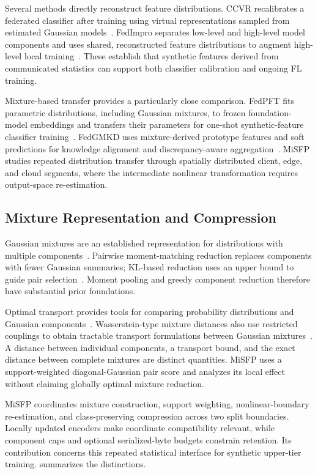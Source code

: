 Several methods directly reconstruct feature distributions. CCVR recalibrates a federated classifier after training using virtual representations sampled from estimated Gaussian models~\cite{luo2021ccvr}. FedImpro separates low-level and high-level model components and uses shared, reconstructed feature distributions to augment high-level local training~\cite{tang2024fedimpro}. These establish that synthetic features derived from communicated statistics can support both classifier calibration and ongoing FL training.

Mixture-based transfer provides a particularly close comparison. FedPFT fits parametric distributions, including Gaussian mixtures, to frozen foundation-model embeddings and transfers their parameters for one-shot synthetic-feature classifier training~\cite{beitollahi2025fedpft}. FedGMKD uses mixture-derived prototype features and soft predictions for knowledge alignment and discrepancy-aware aggregation~\cite{zhang2024fedgmkd}. MiSFP studies repeated distribution transfer through spatially distributed client, edge, and cloud segments, where the intermediate nonlinear transformation requires output-space re-estimation.

\subsection{Mixture Representation and Compression}

Gaussian mixtures are an established representation for distributions with multiple components~\cite{mclachlan2000finite}. Pairwise moment-matching reduction replaces components with fewer Gaussian summaries; KL-based reduction uses an upper bound to guide pair selection~\cite{runnalls2007kl}. Moment pooling and greedy component reduction therefore have substantial prior foundations.

Optimal transport provides tools for comparing probability distributions and Gaussian components~\cite{villani2009optimal}. Wasserstein-type mixture distances also use restricted couplings to obtain tractable transport formulations between Gaussian mixtures~\cite{delon2020wasserstein}. A distance between individual components, a transport bound, and the exact distance between complete mixtures are distinct quantities. MiSFP uses a support-weighted diagonal-Gaussian pair score and analyzes its local effect without claiming globally optimal mixture reduction.

MiSFP coordinates mixture construction, support weighting, nonlinear-boundary re-estimation, and class-preserving compression across two split boundaries. Locally updated encoders make coordinate compatibility relevant, while component caps and optional serialized-byte budgets constrain retention. Its contribution concerns this repeated statistical interface for synthetic upper-tier training.  summarizes the distinctions.

